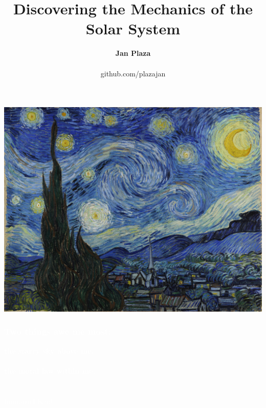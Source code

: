 \documentclass[aspectratio=169,xcolor=pdftex,dvipsnames]{beamer} %
\title{\textbf{Discovering the Mechanics of the Solar System}}
\author{\textbf{\Large Jan Plaza}\\ \ \\
github.com/plazajan}
\begin{document}

{
{
    \includegraphics[width=\paperwidth]{vanGoghStarryNight.jpg}
}
\begin{frame}
\frametitle{\textcolor{white}{\textbf{Two things awe me most:}}}
 
 \textcolor{white}{
{\Huge\textbf{the starry sky above me,\\ \ \\
the moral law within me.}
\ \\ \ \\ \ \\
Immanuel Kant
}}

\end{frame}
}


\maketitle


% 
%
%
\end{document}

